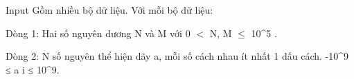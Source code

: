 Input
Gồm nhiều bộ dữ liệu. Với mỗi bộ dữ liệu:

Dòng 1: Hai số nguyên dương N và M với 0 $<$ N, M  $\le$  10^5 .

Dòng 2: N số nguyên thể hiện dãy a, mỗi số cách nhau ít nhất 1 dấu cách. -10^9 ≤ a i ≤ 10^9.